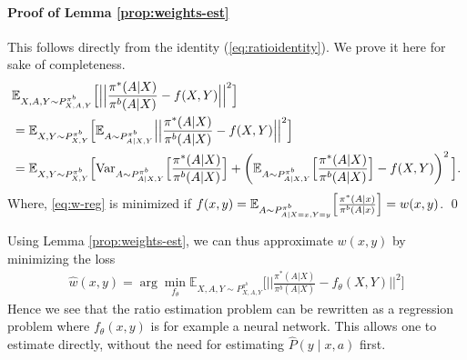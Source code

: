 \paragraph{Proof of Lemma \ref{prop:weights-est}}
This follows directly from the identity (\ref{eq:ratioidentity}). We prove it here for sake of completeness.
\begin{align}
    &\mathbb{E}_{X,A,Y \sim P^{\pi^b}_{X,A,Y}} \Big[\Big|\Big|\frac{\pi^{\ast}(A|X)}{\pi^b (A|X)}-f(X,Y)\Big|\Big|^2\Big] \nonumber \\
    &= \mathbb{E}_{X,Y \sim P^{\pi^b}_{X,Y}} \Big[\mathbb{E}_{A \sim P^{\pi^b}_{A\mid X,Y}} \Big|\Big|\frac{\pi^{\ast}(A|X)}{\pi^b (A|X)}-f(X,Y)\Big|\Big|^2\Big] \nonumber \\
    &= \mathbb{E}_{X,Y \sim P^{\pi^b}_{X,Y}} \Big[\textup{Var}_{A \sim P^{\pi^b}_{A\mid X,Y}}\Big[ \frac{\pi^{\ast}(A|X)}{\pi^b (A|X)} \Big] + \left(\mathbb{E}_{A \sim P^{\pi^b}_{A\mid X,Y}}\Big[ \frac{\pi^{\ast}(A|X)}{\pi^b (A|X)} \Big] - f(X,Y) \right)^2 \Big].
     \label{eq:w-reg}
\end{align}
Where, \eqref{eq:w-reg} is minimized if $f(x, y) = \mathbb{E}_{A \sim P^{\pi^b}_{A\mid X=x,Y=y}}\Big[ \frac{\pi^{\ast}(A|x)}{\pi^b (A|x)} \Big] = w(x,y)$.
\qed

Using Lemma \ref{prop:weights-est}, we can thus approximate $w(x,y)$ by minimizing the loss
\begin{align}
    \hat{w}(x, y) =\arg \min_{f_\theta} \mathbb{E}_{X,A,Y \sim P^{\pi^b}_{X,A,Y}} \Big[\Big|\Big|\frac{\pi^{\ast}(A|X)}{\pi^b (A|X)}-f_\theta(X,Y)\Big|\Big|^2\Big] \label{eq:weights-loss}
\end{align}
Hence we see that the ratio estimation problem can be rewritten as a regression problem where $f_\theta(x,y)$ is for example a neural network. This allows one to estimate directly, without the need for estimating $\hat{P}(y\mid x, a)$ first.


